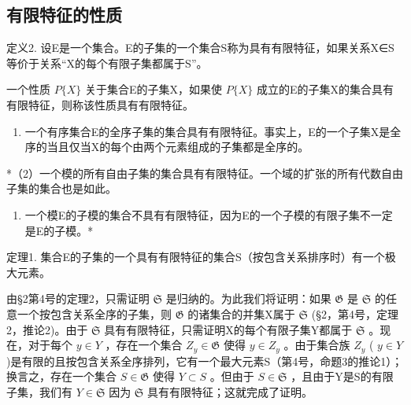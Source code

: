 \subsection{有限特征的性质}

定义2. 设E是一个集合。E的子集的一个集合S称为具有有限特征，如果关系X∈S等价于关系“X的每个有限子集都属于S”。

一个性质 \(P\{X\}\) 关于集合E的子集X，如果使 \(P\{X\}\) 成立的E的子集X的集合具有有限特征，则称该性质具有有限特征。


\begin{enumerate}
\def\labelenumi{(\arabic{enumi})}
\tightlist
\item
  一个有序集合E的全序子集的集合具有有限特征。事实上，E的一个子集X是全序的当且仅当X的每个由两个元素组成的子集都是全序的。
\end{enumerate}

*（2）一个模的所有自由子集的集合具有有限特征。一个域的扩张的所有代数自由子集的集合也是如此。

\begin{enumerate}
\def\labelenumi{(\arabic{enumi})}
\setcounter{enumi}{2}
\tightlist
\item
  一个模E的子模的集合不具有有限特征，因为E的一个子模的有限子集不一定是E的子模。*
\end{enumerate}

定理1. 集合E的子集的一个具有有限特征的集合S（按包含关系排序时）有一个极大元素。

由§2第4号的定理2，只需证明 \(\mathfrak{S}\) 是归纳的。为此我们将证明：如果 \(\mathfrak{G}\) 是 \(\mathfrak{S}\) 的任意一个按包含关系全序的子集，则 \(\mathfrak{G}\) 的诸集合的并集X属于 \(\mathfrak{S}\) (§2，第4号，定理2，推论2)。由于 \(\mathfrak{S}\) 具有有限特征，只需证明X的每个有限子集Y都属于 \(\mathfrak{S}\) 。现在，对于每个 \(y \in Y\) ，存在一个集合 \(Z_y \in \mathfrak{G}\) 使得 \(y \in Z_y\) 。由于集合族 \(Z_y\) ( \(y \in Y\) )是有限的且按包含关系全序排列，它有一个最大元素S（第4号，命题3的推论1）；换言之，存在一个集合 \(S \in \mathfrak{G}\) 使得 \(Y \subset S\) 。但由于 \(S \in \mathfrak{S}\) ，且由于Y是S的有限子集，我们有 \(Y \in \mathfrak{S}\) 因为 \(\mathfrak{S}\) 具有有限特征；这就完成了证明。

